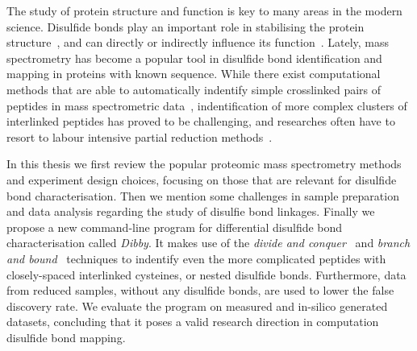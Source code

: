 

The study of protein structure and function is key to many areas in the modern science. Disulfide bonds play an important role in stabilising the protein structure~\cite{wedemeyer2000disulfide}, and can directly or indirectly influence its function~\cite{nagahara2011intermolecular}. Lately, mass spectrometry has become a popular tool in disulfide bond identification and mapping in proteins with known sequence. While there exist computational methods that are able to automatically indentify simple crosslinked pairs of peptides in mass spectrometric data~\cite{lakbub2018recent, liu2014facilitating}, indentification of more complex clusters of interlinked peptides has proved to be challenging, and researches often have to resort to labour intensive partial reduction methods~\cite{wu1997novel, li2013disulfide}.

In this thesis we first review the popular proteomic mass spectrometry methods and experiment design choices, focusing on those that are relevant for disulfide bond characterisation. Then we mention some challenges in sample preparation and data analysis regarding the study of disulfie bond linkages. Finally we propose a new command-line program for differential disulfide bond characterisation called \emph{Dibby}. It makes use of the \emph{divide and conquer}~\cite{smith1985design} and \emph{branch and bound}~\cite{boyd2007branch} techniques to indentify even the more complicated peptides with closely-spaced interlinked cysteines, or nested disulfide bonds. Furthermore, data from reduced samples, without any disulfide bonds, are used to lower the false discovery rate. We evaluate the program on measured and in-silico generated datasets, concluding that it poses a valid research direction in computation disulfide bond mapping.